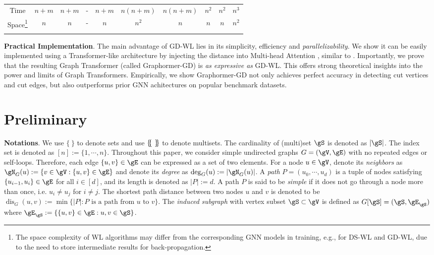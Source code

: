 \documentclass{article} %
\newcommand*{\ldblbrace}{\{\mskip-5mu\{}
\newcommand*{\rdblbrace}{\}\mskip-5mu\}}
\newcommand*{\dis}{{\operatorname{dis}}}
\begin{document}
\begin{table}[t]
\begin{tabular}{c|cccc|cc|cc|c}
    \hline
    Time & $n\!+\!m$ & $n\!+\!m$ & - & $n\!+\!m$ & $n(n\!+\!m)$ & $n(n\!+\!m)$ & $n^2$ & $n^2$ & $n^3$\\
    Space\footnote{The space complexity of WL algorithms may differ from the corresponding GNN models in training, e.g., for DS-WL and GD-WL, due to the need to store intermediate results for back-propagation.} & $n$ & $n$ & - & $n$ & $n^2$ & $n$ & $n$ & $n$ & $n^2$\\
    \Xhline{0.75pt}
    \end{tabular}
    \vspace{-8pt}
\end{table}

\textbf{Practical Implementation}.
The main advantage of GD-WL lies in its simplicity, efficiency and \emph{parallelizability}. We show it can be easily implemented using a Transformer-like architecture by injecting the distance into Multi-head Attention \citep{vaswani2017attention}, similar to \citet{ying2021transformers}. Importantly, we prove that the resulting Graph Transformer (called Graphormer-GD) is \emph{as expressive as} GD-WL. This offers strong theoretical insights into the power and limits of Graph Transformers. Empirically, we show Graphormer-GD not only achieves perfect accuracy in detecting cut vertices and cut edges, but also outperforms prior GNN achitectures on popular benchmark datasets.
\vspace{-2pt}

\section{Preliminary}
\label{sec:preliminary}
\vspace{-1pt}
\textbf{Notations}. We use $\{\ \}$ to denote sets and use $\ldblbrace\ \rdblbrace$ to denote multisets. The cardinality of (multi)set $\gS$ is denoted as $|\gS|$. The index set is denoted as $[n]:=\{1,\cdots,n\}$. Throughout this paper, we consider simple undirected graphs $G=(\gV,\gE)$ with no repeated edges or self-loops. Therefore, each edge $\{u,v\}\in\gE$ can be expressed as a set of two elements. For a node $u\in\gV$, denote its \emph{neighbors} as $\gN_G(u):=\{v\in\gV:\{u,v\}\in\gE\}$ and denote its \emph{degree} as $\deg_G(u):=|\gN_G(u)|$. A \emph{path} $P=(u_0,\cdots,u_d)$ is a tuple of nodes satisfying $\{u_{i-1},u_i\}\in\gE$ for all $i\in[d]$, and its length is denoted as $|P|:=d$. A path $P$ is said to be \emph{simple} if it does not go through a node more than once, i.e. $u_i\neq u_j$ for $i\neq j$. The shortest path distance between two nodes $u$ and $v$ is denoted to be $\dis_G(u,v):=\min\{|P|:P\text{ is a path from }u\text{ to }v\}$. The \emph{induced subgraph} with vertex subset $\gS\subset\gV$ is defined as $G[\gS]=(\gS,\gE_\gS)$ where $\gE_\gS:=\{\{u,v\}\in\gE:u,v\in\gS\}$.
\end{document}
